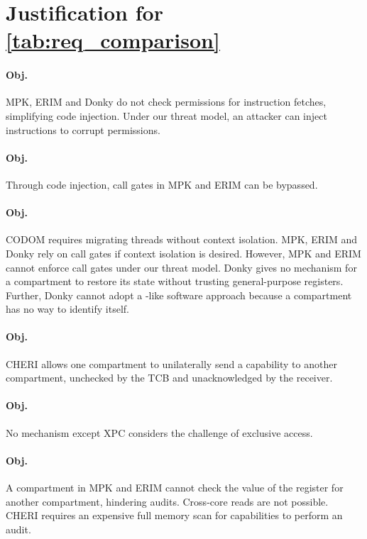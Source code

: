 \section{Justification for \autoref{tab:req_comparison}}
\label{app:justification_table1}

\paragraph{Obj. }
MPK, ERIM and Donky do not check permissions for instruction fetches, 
simplifying code injection.
Under our threat model, an attacker can inject  instructions 
to corrupt permissions.

\paragraph{Obj. }
Through code injection, call gates in MPK and ERIM can be bypassed.

\paragraph{Obj. }
CODOM requires migrating threads without context isolation.
MPK, ERIM and Donky rely on call gates if context isolation is desired.
However, MPK and ERIM cannot enforce call gates under our threat model.
Donky gives no mechanism for a compartment to restore its state without
trusting general-purpose registers. 
Further, Donky cannot adopt a \seccells-like software approach because a 
compartment has no way to identify itself.

\paragraph{Obj. }
CHERI allows one compartment to unilaterally send a capability to another compartment, 
unchecked by the TCB and unacknowledged by the receiver.

\paragraph{Obj. }
No mechanism except XPC considers the challenge of exclusive access.

\paragraph{Obj. }
A compartment in MPK and ERIM cannot check the value of the 
register for another compartment, hindering audits.
Cross-core  reads are not possible.
CHERI requires an expensive full memory scan for capabilities to perform
an audit.

